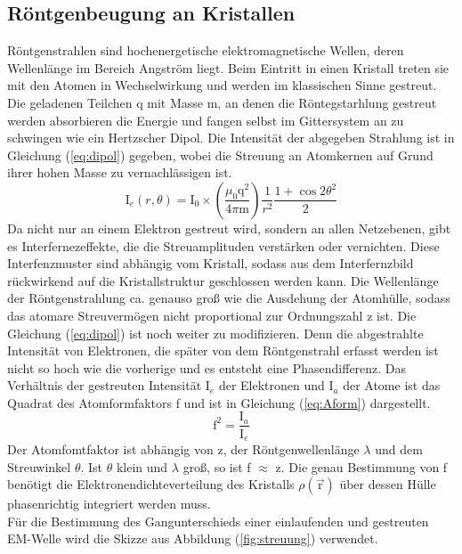 \subsection{Röntgenbeugung an Kristallen}
Röntgenstrahlen sind hochenergetische elektromagnetische Wellen, deren Wellenlänge im Bereich Angström liegt. 
Beim Eintritt in einen Kristall treten sie mit den Atomen in Wechselwirkung und werden im klassischen Sinne gestreut.
Die geladenen Teilchen q mit Masse m, an denen die Röntegstarhlung gestreut werden absorbieren die Energie und fangen selbst im Gittersystem an zu schwingen wie ein Hertzscher Dipol.
Die Intensität der abgegeben Strahlung ist in Gleichung (\ref{eq:dipol}) gegeben, wobei die Streuung an Atomkernen auf Grund ihrer hohen Masse zu vernachlässigen ist.
\begin{equation}
\text{I}_e(r,\theta) = \text{I}_0\times \left(\frac{\mu_0 \text{q}^2}{4 \pi \text{m}}\right) \frac{1}{r^2} \frac{1+\cos{2\theta}^2}{2}
\label{eq:dipol}
\end{equation}
Da nicht nur an einem Elektron gestreut wird, sondern an allen Netzebenen, gibt es Interfernezeffekte, die die Streuamplituden verstärken oder vernichten.
Diese Interfenzmuster sind abhängig vom Kristall, sodass aus dem Interfernzbild rückwirkend auf die Kristallstruktur geschlossen werden kann.
Die Wellenlänge der Röntgenstrahlung ca. genauso groß wie die Ausdehung der Atomhülle, sodass das atomare Streuvermögen nicht proportional zur Ordnungszahl z ist.
Die Gleichung (\ref{eq:dipol}) ist noch weiter zu modifizieren.
Denn die abgestrahlte Intensität von Elektronen, die später von dem Röntgenstrahl erfasst werden ist nicht so hoch wie die vorherige und es entsteht eine Phasendifferenz.
Das Verhältnis der gestreuten Intensität I$_e$ der Elektronen und I$_a$ der Atome ist das Quadrat des Atomformfaktors f und ist in Gleichung (\ref{eq:Aform}) dargestellt.
\begin{equation}
\text{f}^2 = \frac{\text{I}_a}{\text{I}_e}
\label{eq:Aform}
\end{equation}
Der Atomfomtfaktor ist abhängig von z, der Röntgenwellenlänge $\lambda$ und dem Streuwinkel $\theta$. 
Ist $\theta$ klein und $\lambda$ groß, so ist f $\approx$ z.
Die genau Bestimmung von f benötigt die Elektronendichteverteilung des Kristalls $\rho(\vec{\text{r}})$ über dessen Hülle phasenrichtig integriert werden muss.\\
Für die Bestimmung des Gangunterschieds einer einlaufenden und gestreuten EM-Welle wird die Skizze aus Abbildung (\ref{fig:streuung}) verwendet.
